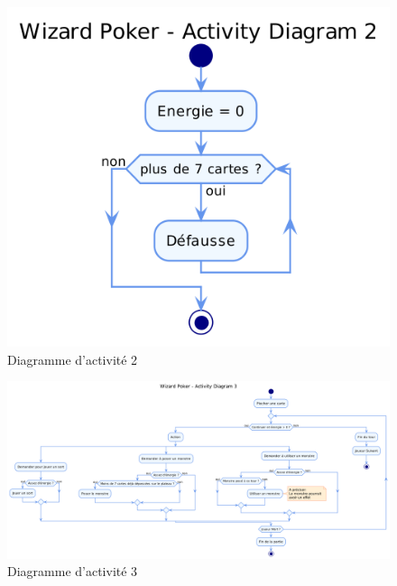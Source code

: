 \documentclass[11pt,a4paper]{article}
\begin{document}
\begin{figure}[ht]
  \centering
  \includegraphics[width=1\textwidth]{../uml_files/ActivityDiagram2.png}
  \caption{\label{fig:act2} Diagramme d'activité 2}
\end{figure}

\begin{figure}[ht]
  \centering
  \includegraphics[width=1\textwidth]{../uml_files/ActivityDiagram3.png}
  \caption{\label{fig:act3} Diagramme d'activité 3}
\end{figure}

\clearpage
\printindex
\end{document}
